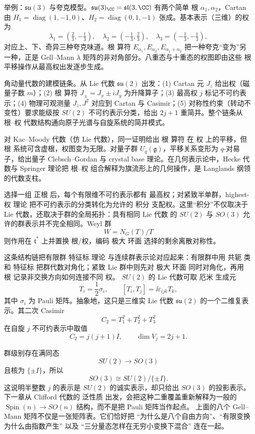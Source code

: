 举例：$\mathfrak{su}(3)$ 与夸克模型。$\mathfrak{su}(3)_\CC=\mathfrak{sl}(3,\CC)$ 有两个简单 根 $\alpha_1,\alpha_2$，Cartan 由 $H_1=\operatorname{diag}(1,-1,0)$、$H_2=\operatorname{diag}(0,1,-1)$ 张成。基本表示（三维）的权为
\[
\lambda_1=(\tfrac23,-\tfrac13),\quad
\lambda_2=(-\tfrac13,\tfrac23),\quad
\lambda_3=(-\tfrac13,-\tfrac13),
\]
对应上、下、奇异三种夸克味道。根 算符 $E_{\alpha_1},E_{\alpha_2},E_{\alpha_1+\alpha_2}$ 把一种夸克“变为”另一种，正是 Gell--Mann $\lambda$ 矩阵的非对角部分。八重态与十重态的权图即由这些 根 平移操作从最高权出发逐步生成。

角动量代数的建模链条。从 Lie 代数 $\mathfrak{su}(2)$ 出发：(1) Cartan 元 $J_z$ 给出权（磁量子数 $m$）；(2) 根 算符 $J_\pm=J_x\pm iJ_y$ 为升降算子；(3) 最高权 $j$ 标记不可约表示；(4) 物理可观测量 $J_z,J^2$ 对应到 Cartan 与 Casimir；(5) 对称性约束（转动不变性）要求能级按 $SU(2)$ 不可约表示分类，给出 $2j+1$ 重简并。整个链条从 根--权 代数结构通向原子光谱与自旋系统的简并模式。

对 Kac--Moody 代数（仿 Lie 代数），同一证明给出 根 算符 在 权 上的平移，但 根 系统可含虚根，权图变为无限。对量子群 $U_q(\mathfrak g)$，平移关系变形为 $q$-对易子，给出量子 Clebsch--Gordan 与 crystal base 理论。在几何表示论中，Hecke 代数与 Springer 理论把 根--权 组合解释为旗流形上的几何操作，是 Langlands 纲领的代数支柱。

选择一组 正根 后，每个有限维不可约表示都有 最高权；对紧致半单群，highest-权 理论 把不可约表示的分类转化为允许的 积分 支配权。这里“积分”不仅取决于 Lie 代数，还取决于群的全局拓扑：具有相同 Lie 代数 的 $SU(2)$ 与 $SO(3)$ 允许的群表示并不完全相同。Weyl 群
\[
W=N_G(T)/T
\]
则作用在 $\mathfrak t^*$ 上并置换 根/权，编码 极大 环面 选择的剩余离散对称性。

这条结构链把有限群 特征标 理论 与连续群表示论对应起来：有限群中用 共轭 类 和 特征标 把群代数对角化；紧致 Lie 群中则先对 极大 环面 同时对角化，再用 根 记录非交换方向如何连接不同 权。
$SU(2)$ 的 Lie 代数可取 厄米 生成元
\[
T_i=\frac12\sigma_i,
\qquad
[T_i,T_j]=\ii\varepsilon_{ijk}T_k,
\]
其中 $\sigma_i$ 为 Pauli 矩阵。抽象地，这只是三维实 Lie 代数 $\mathfrak{su}(2)$ 的一个二维复表示。其二次 Casimir
\[
C_2=T_1^2+T_2^2+T_3^2
\]
在自旋 $j$ 不可约表示中取值
\[
C_2=j(j+1)I,
\qquad
\dim V_j=2j+1.
\]

群级别存在满同态
\[
SU(2)\longrightarrow SO(3)
\]
且核为 $\{\pm I\}$，所以
\[
SO(3)\cong SU(2)/\{\pm I\}.
\]
这说明半整数 $j$ 的表示是 $SU(2)$ 的诚实表示，却只给出 $SO(3)$ 的投影表示。下一章从 Clifford 代数的 泛性质 出发，会把这种二重覆盖重新解释为一般的 $\operatorname{Spin}(n)\to SO(n)$ 结构，而不是把 Pauli 矩阵当作起点。
上面的八个 Gell--Mann 矩阵不仅是一张矩阵表。它们恰好把 ``为什么是八个自由方向''、``有限变换为什么由指数产生'' 以及 ``三分量态怎样在无穷小变换下混合'' 连在一起。


